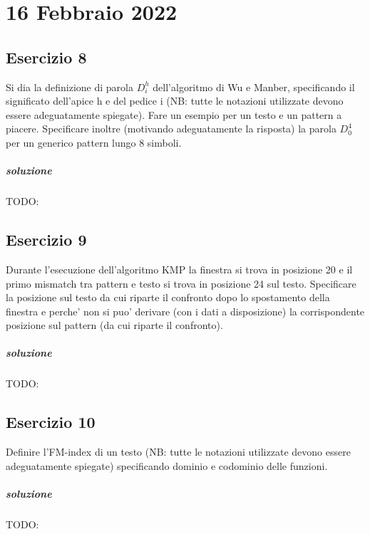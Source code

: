 \chapter{16 Febbraio 2022}

\section{Esercizio 8}

Si dia la definizione di parola $D^h_i$ dell'algoritmo di Wu e Manber, specificando il significato dell'apice h e del pedice i (NB: tutte le notazioni utilizzate devono essere adeguatamente spiegate). Fare un esempio per un testo e un pattern a piacere. Specificare inoltre (motivando adeguatamente la risposta) la parola $D^4_0$ per un generico pattern lungo 8 simboli.

\paragraph{soluzione} TODO:

\section{Esercizio 9}

Durante l'esecuzione dell'algoritmo KMP la finestra si trova in posizione 20 e il primo mismatch tra pattern e testo si trova in posizione 24 sul testo.
Specificare la posizione sul testo da cui riparte il confronto dopo lo spostamento della finestra e perche' non si puo' derivare (con i dati a disposizione) la corrispondente posizione sul pattern (da cui riparte il confronto).

\paragraph{soluzione} TODO:

\section{Esercizio 10}

Definire l'FM-index di un testo (NB: tutte le notazioni utilizzate devono essere adeguatamente spiegate) specificando dominio e codominio delle funzioni.

\paragraph{soluzione} TODO:
